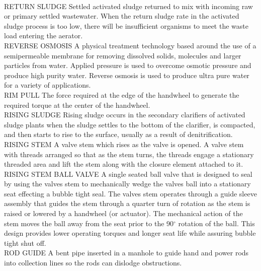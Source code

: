 \documentclass{article}
\begin{document}
\vspace{0.3cm}\\
RETURN SLUDGE
Settled activated sludge returned to mix with incoming raw or primary settled wastewater. When the return sludge rate in the activated sludge process is too low, there will be insufficient organisms to meet the waste load entering the aerator.
\vspace{0.3cm}\\
REVERSE OSMOSIS
A physical treatment technology based around the use of a semipermeable membrane for removing dissolved solids, molecules and larger particles from water. Applied pressure is used to overcome osmotic pressure and produce high purity water. Reverse osmosis is used to produce ultra pure water for a variety of applications.
\vspace{0.3cm}\\
RIM PULL
The force required at the edge of the handwheel to generate the required torque at the center of the handwheel.
\vspace{0.3cm}\\
RISING SLUDGE
Rising sludge occurs in the secondary clarifiers of activated sludge plants when the sludge settles to the bottom of the clarifier, is compacted, and then starts to rise to the surface, usually as a result of denitrification.
\vspace{0.3cm}\\
RISING STEM
A valve stem which rises as the valve is opened.  A valve stem with threads arranged so that as the stem turns, the threads engage a stationary threaded area and lift the stem along with the closure element attached to it.
\vspace{0.3cm}\\
RISING STEM BALL VALVE
A single seated ball valve that is designed to seal by using the valves stem to mechanically wedge the valves ball into a stationary seat effecting a bubble tight seal. The valves stem operates through a guide sleeve assembly that guides the stem through a quarter turn of rotation as the stem is raised or lowered by a handwheel (or actuator). The mechanical action of the stem moves the ball away from the seat prior to the 90$^{\circ}$ rotation of the ball. This design provides lower operating torques and longer seat life while assuring bubble tight shut off.
\vspace{0.3cm}\\
ROD GUIDE
A bent pipe inserted in a manhole to guide hand and power rods into collection lines so the rods can dislodge obstructions. 
\vspace{0.3cm}\\
\end{document}
